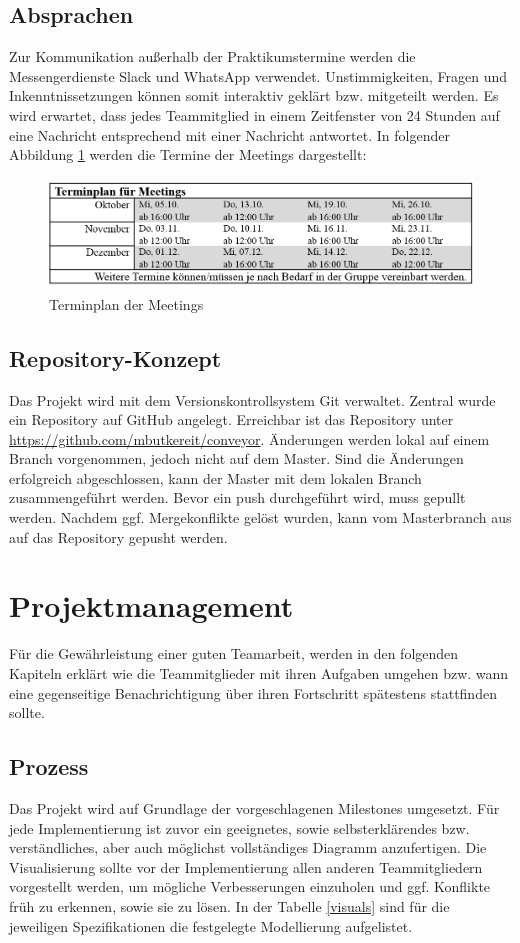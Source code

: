 \documentclass[a4paper, 11pt]{article}
\begin{document}
\subsection{Absprachen}
Zur Kommunikation außerhalb der Praktikumstermine werden die Messengerdienste Slack und WhatsApp verwendet. Unstimmigkeiten, Fragen und Inkenntnissetzungen können somit interaktiv geklärt bzw. mitgeteilt werden. Es wird erwartet, dass jedes Teammitglied in einem Zeitfenster von 24 Stunden auf eine Nachricht entsprechend mit einer Nachricht antwortet. In folgender Abbildung \ref{meets} werden die Termine der Meetings dargestellt:
\begin{figure}[h]
\centering 
\includegraphics[scale=0.85]{images/Terminplan_Meetings.png}
\caption{Terminplan der Meetings}
\label{meets}
\end{figure}

\newpage

\subsection{Repository-Konzept}
Das Projekt wird mit dem Versionskontrollsystem Git verwaltet. Zentral wurde ein Repository auf GitHub angelegt. Erreichbar ist das Repository unter \url{https://github.com/mbutkereit/conveyor}. Änderungen werden lokal auf einem Branch vorgenommen, jedoch nicht auf dem Master. Sind die Änderungen erfolgreich abgeschlossen, kann der Master mit dem lokalen Branch zusammengeführt werden. Bevor ein push durchgeführt wird, muss gepullt werden. Nachdem ggf. Mergekonflikte gelöst wurden, kann vom Masterbranch aus auf das Repository gepusht werden.

\section{Projektmanagement}
Für die Gewährleistung einer guten Teamarbeit, werden in den folgenden Kapiteln erklärt wie die Teammitglieder mit ihren Aufgaben umgehen bzw. wann eine gegenseitige Benachrichtigung über ihren Fortschritt spätestens stattfinden sollte.

\subsection{Prozess}
Das Projekt wird auf Grundlage der vorgeschlagenen Milestones umgesetzt. Für jede Implementierung ist zuvor ein geeignetes, sowie selbsterklärendes bzw. verständliches, aber auch möglichst vollständiges Diagramm anzufertigen. Die Visualisierung sollte vor der Implementierung allen anderen Teammitgliedern vorgestellt werden, um mögliche Verbesserungen einzuholen und ggf. Konflikte früh zu erkennen, sowie sie zu lösen. In der Tabelle \ref{visuals} sind für die jeweiligen Spezifikationen die festgelegte Modellierung aufgelistet.
\end{document}
